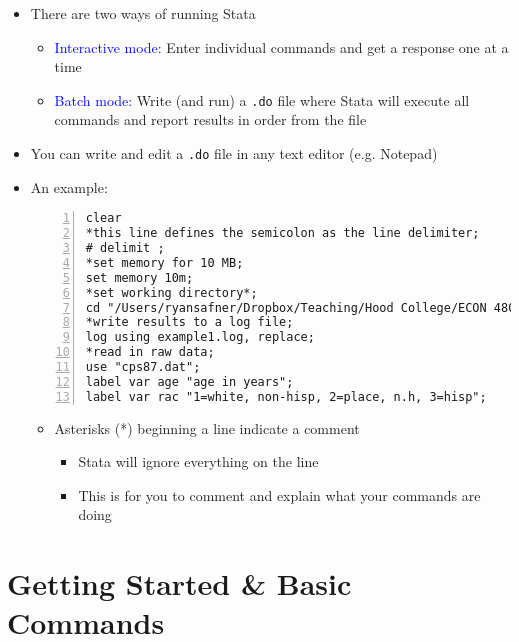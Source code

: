 \documentclass{article}
\begin{document}
\begin{itemize}
	\item There are two ways of running Stata
	\begin{itemize}
			\item \textcolor{blue}{Interactive mode:} Enter individual commands and get a response one at a time
		\item \textcolor{blue}{Batch mode:} Write (and run) a \texttt{.do} file where Stata will execute all commands and report results in order from the file
	\end{itemize}	
	\item You can write and edit a \texttt{.do} file in any text editor (e.g. Notepad) 
	\item An example: 
	\begin{Verbatim}[frame=single, numbers=left, numbersep=2pt] 
clear
*this line defines the semicolon as the line delimiter;
# delimit ;
*set memory for 10 MB;
set memory 10m;
*set working directory*;
cd "/Users/ryansafner/Dropbox/Teaching/Hood College/ECON 480 - Econometrics"
*write results to a log file;
log using example1.log, replace;
*read in raw data;
use "cps87.dat";
label var age "age in years";
label var rac "1=white, non-hisp, 2=place, n.h, 3=hisp";
\end{Verbatim}
	\begin{itemize}
	\item Asterisks (*) beginning a line indicate a comment
	\begin{itemize}
		\item Stata will ignore everything on the line 
		\item This is for you to comment and explain what your commands are doing
	\end{itemize}	
\end{itemize}
\end{itemize}


\section{Getting Started \& Basic Commands}
\end{document}
